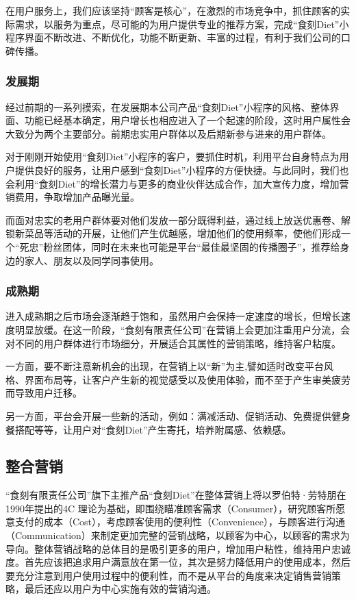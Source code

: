 \documentclass[UTF8,12pt]{ctexart}
\numberwithin{figure}{section}%
\begin{document}
\begin{spacing}{2}
在用户服务上，我们应该坚持“顾客是核心”，在激烈的市场竞争中，抓住顾客的实际需求，以服务为重点，尽可能的为用户提供专业的推荐方案，完成“食刻Diet”小程序界面不断改进、不断优化，功能不断更新、丰富的过程，有利于我们公司的口碑传播。

\subsubsection{发展期}

经过前期的一系列摸索，在发展期本公司产品“食刻Diet”小程序的风格、整体界面、功能已经基本确定，用户增长也相应进入了一个起速的阶段，这时用户属性会大致分为两个主要部分。前期忠实用户群体以及后期新参与进来的用户群体。

对于刚刚开始使用“食刻Diet”小程序的客户，要抓住时机，利用平台自身特点为用户提供良好的服务，让用户感到“食刻Diet”小程序的方便快捷。与此同时，我们也会利用“食刻Diet”的增长潜力与更多的商业伙伴达成合作，加大宣传力度，增加营销费用，争取增加产品曝光量。

而面对忠实的老用户群体要对他们发放一部分既得利益，通过线上放送优惠卷、解锁新菜品等活动的开展，让他们产生优越感，增加他们的使用频率，使他们形成一个“死忠”粉丝团体，同时在未来也可能是平台“最佳最坚固的传播圈子”，推荐给身边的家人、朋友以及同学同事使用。

\subsubsection{成熟期}
进入成熟期之后市场会逐渐趋于饱和，虽然用户会保持一定速度的增长，但增长速度明显放缓。在这一阶段，“食刻有限责任公司”在营销上会更加注重用户分流，会对不同的用户群体进行市场细分，开展适合其属性的营销策略，维持客户粘度。

一方面，要不断注意新机会的出现，在营销上以“新”为主,譬如适时改变平台风格、界面布局等，让客户产生新的视觉感受以及使用体验，而不至于产生审美疲劳而导致用户迁移。

另一方面，平台会开展一些新的活动，例如：满减活动、促销活动、免费提供健身餐搭配等等，让用户对“食刻Diet”产生寄托，培养附属感、依赖感。

\subsection{整合营销}
“食刻有限责任公司”旗下主推产品“食刻Diet”在整体营销上将以罗伯特·劳特朋在1990年提出的4C 理论为基础，即围绕瞄准顾客需求（Consumer），研究顾客所愿意支付的成本（Cost），考虑顾客使用的便利性（Convenience），与顾客进行沟通（Communication）来制定更加完整的营销战略，以顾客为中心，以顾客的需求为导向。整体营销战略的总体目的是吸引更多的用户，增加用户粘性，维持用户忠诚度。首先应该把追求用户满意放在第一位，其次是努力降低用户的使用成本，然后要充分注意到用户使用过程中的便利性，而不是从平台的角度来决定销售营销策略，最后还应以用户为中心实施有效的营销沟通。


\end{spacing}
\end{document}
